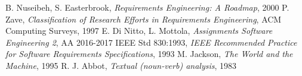 \clearpage
\begin{thebibliography}{9}
B. Nuseibeh, S. Easterbrook, \emph{Requirements Engineering: A Roadmap}, 2000
P. Zave, \emph{Classification of Research Efforts in Requirements
Engineering}, ACM Computing Surveys, 1997
 E. Di Nitto, L. Mottola, \emph{Assignments Software Engineering 2}, AA 2016-2017
IEEE Std 830:1993, \emph{IEEE Recommended Practice for Software Requirements Specifications}, 1993
M. Jackson, \emph{The World and the Machine}, 1995
R. J. Abbot, \emph{Textual (noun-verb) analysis}, 1983
\end{thebibliography}